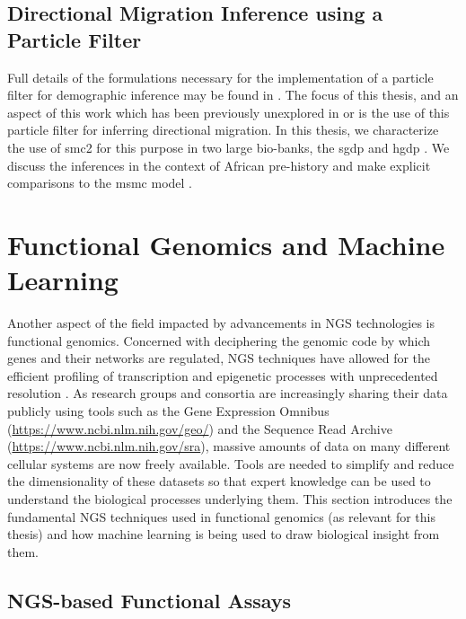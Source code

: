 \subsection{Directional Migration Inference using a Particle Filter}

Full details of the formulations necessary for the implementation of a particle filter for demographic inference may be found in \cite{10.1371/journal.pone.0247647}. The focus of this thesis, and an aspect of this work which has been previously unexplored in \cite{10.1371/journal.pone.0247647} or \cite{Henderson2017} is the use of this particle filter for inferring directional migration. In this thesis, we characterize the use of \gls{smc2} for this purpose in two large bio-banks, the \gls{sgdp} and \gls{hgdp} \cite{Mallick2016, Bergstrom2019}. We discuss the inferences in the context of African pre-history and make explicit comparisons to the \gls{msmc} model \cite{Schiffels2014}. 

\section{Functional Genomics and Machine Learning} \label{intro:fungen}

Another aspect of the field impacted by advancements in NGS technologies is functional genomics. Concerned with deciphering the genomic code by which genes and their networks are regulated, NGS techniques have allowed for the efficient profiling of transcription and epigenetic processes with unprecedented resolution \cite{Morozova2008,Cullum2011,Morozova2008a,Hurd2009,T2010}. As research groups and consortia are increasingly sharing their data publicly using tools such as the Gene Expression Omnibus (\url{https://www.ncbi.nlm.nih.gov/geo/}) and the Sequence Read Archive (\url{https://www.ncbi.nlm.nih.gov/sra}), massive amounts of data on many different cellular systems are now freely available. Tools are needed to simplify and reduce the dimensionality of these datasets so that expert knowledge can be used to understand the biological processes underlying them. This section introduces the fundamental NGS techniques used in functional genomics (as relevant for this thesis) and how machine learning is being used to draw biological insight from them.

\subsection{NGS-based Functional Assays}

